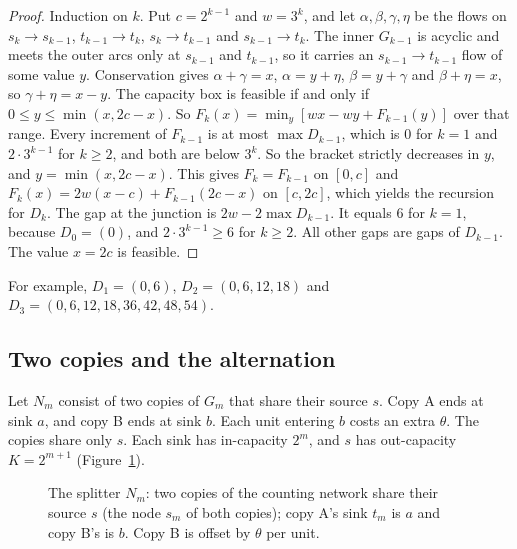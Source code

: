 \begin{proof}
Induction on $k$. Put $c=2^{k-1}$ and $w=3^k$, and let $\alpha,\beta,\gamma,\eta$ be the flows on
$s_k\to s_{k-1}$, $t_{k-1}\to t_k$, $s_k\to t_{k-1}$ and $s_{k-1}\to t_k$. The inner $G_{k-1}$ is acyclic
and meets the outer arcs only at $s_{k-1}$ and $t_{k-1}$, so it carries an $s_{k-1}\to t_{k-1}$ flow of
some value $y$. Conservation gives $\alpha+\gamma=x$, $\alpha=y+\eta$, $\beta=y+\gamma$ and
$\beta+\eta=x$, so $\gamma+\eta=x-y$. The capacity box is feasible if and only if
$0\le y\le\min(x,2c-x)$. So $F_k(x)=\min_y[wx-wy+F_{k-1}(y)]$ over that range. Every increment of
$F_{k-1}$ is at most $\max D_{k-1}$, which is $0$ for $k=1$ and $2\cdot3^{k-1}$ for $k\ge2$, and both are
below $3^k$. So the bracket strictly decreases in $y$, and $y=\min(x,2c-x)$. This gives $F_k=F_{k-1}$ on
$[0,c]$ and $F_k(x)=2w(x-c)+F_{k-1}(2c-x)$ on $[c,2c]$, which yields the recursion for $D_k$. The gap at
the junction is $2w-2\max D_{k-1}$. It equals $6$ for $k=1$, because $D_0=(0)$, and $2\cdot3^{k-1}\ge6$
for $k\ge2$. All other gaps are gaps of $D_{k-1}$. The value $x=2c$ is feasible.
\end{proof}

For example, $D_1=(0,6)$, $D_2=(0,6,12,18)$ and $D_3=(0,6,12,18,36,42,48,54)$.

\subsection{Two copies and the alternation}

Let $N_m$ consist of two copies of $G_m$ that share their source $s$. Copy A ends at sink $a$, and copy
B ends at sink $b$. Each unit entering $b$ costs an extra $\theta$. The copies share only $s$. Each sink
has in-capacity $2^m$, and $s$ has out-capacity $K=2^{m+1}$ (Figure~\ref{fig:Nm}).

\begin{figure}[t]
\centering
{}
\caption{The splitter $N_m$: two copies of the counting network share their source $s$ (the node $s_m$
of both copies); copy A's sink $t_m$ is $a$ and copy B's is $b$. Copy B is offset by $\theta$ per unit.}
\label{fig:Nm}
\end{figure}

